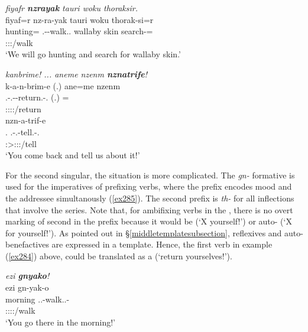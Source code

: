 \begin{exe}
	\ex \emph{fiyafr \textbf{nzrayak} tauri woku thoraksir.}\\
	\glll fiyaf=r nz-ra-yak tauri woku thorak-si=r\\
	hunting=\Purp{} \Fnsg.\Bet-\Irr-walk.\Ext.\Ndu{} wallaby skin search-\Nmlz=\Purp{}\\
	{} \footnotesize{\Fpl:\Sbj:\Irr:\Ipfv/walk} {} {} {}\\
	\trans `We will go hunting and search for wallaby skin.'
	\label{ex283}
\end{exe}
\begin{exe}
	\ex \emph{kanbrime! ... aneme nzenm \textbf{nznatrife}!}\\
	\glll k-a-n-brim-e (.) ane=me nzenm\\
	\M.\Bet-\Vc.\Du-\Venit-return.\Rs-\Snsg.\Imp{} (.) \Dem=\Ins{}\\
	\footnotesize{\Sdu:\Sbj:\Imp:\Pfv:\Venit/return} {} {} {}\\
	\sn
	\glll nzn-a-trif-e\\
	\Fnsg.\Dat{} \Fnsg.\Bet-\Vc.\Du-tell.\Rs-\Snsg.\Imp{}\\
	\footnotesize{\Sdu:\Sbj>\Fdu:\Obj:\Imp:\Pfv/tell}\\
	\trans `You come back and tell us about it!'
	\label{ex284}
\end{exe}

For the second singular, the situation is more complicated. The \emph{gn-} formative is used for the imperatives of prefixing verbs, where the prefix encodes  mood and the addressee simultanously (\ref{ex285}). The second  prefix is \emph{th-} for all inflections that involve the \Bet{} series. Note that, for ambifixing verbs in the , there is no overt marking of second  in the prefix because it would be  (`X yourself!') or auto- (`X for yourself!'). As pointed out in \S{}\ref{middletemplatesubsection}, reflexives and auto-benefactives are expressed in a  template. Hence, the first verb in example (\ref{ex284}) above, could be translated as a  (`return yourselves!').

\begin{exe}
	\ex \emph{ezi \textbf{gnyako}!}\\
	\glll ezi gn-yak-o\\
	morning \Ssg.\Bet.\Imp-walk.\Ext.\Ndu-\Andat\\
	{} \footnotesize{\Ssg:\Sbj:\Imp:\Ipfv:\Andat/walk}\\
	\trans `You go there in the morning!'
	\label{ex285}
\end{exe}

